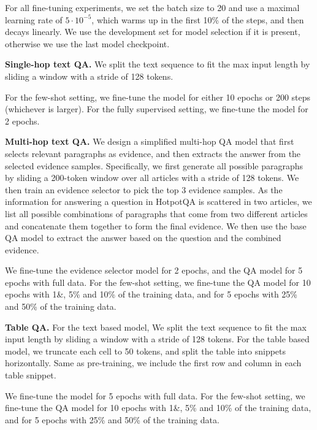\documentclass[11pt]{article}
\begin{document}
For all fine-tuning experiments, we set the batch size to 20 and use a maximal learning rate of $5 \cdot 10^{-5}$, which warms up in the first 10\% of the steps, and then decays linearly. We use the development set for model selection if it is present, otherwise we use the last model checkpoint. 

\noindent\textbf{Single-hop text QA.}
We split the text sequence to fit the max input length by sliding a window with a stride of 128 tokens.

For the few-shot setting, we fine-tune the model for either 10 epochs or 200 steps (whichever is larger). For the fully supervised setting, we fine-tune the model for 2 epochs.

\noindent\textbf{Multi-hop text QA.}
We design a simplified multi-hop QA model that first selects relevant paragraphs as evidence, and then extracts the answer from the selected evidence samples. Specifically, we first generate all possible paragraphs by sliding a 200-token window over all articles with a stride of 128 tokens. We then train an evidence selector to pick the top 3 evidence samples. As the information for answering a question in HotpotQA is scattered in two articles, we list all possible combinations of paragraphs that come from two different articles and concatenate them together to form the final evidence. We then use the base QA model to extract the answer based on the question and the combined evidence.

We fine-tune the evidence selector model for 2 epochs, and the QA model for 5 epochs with full data. For the few-shot setting, we fine-tune the QA model for 10 epochs with 1\&, 5\% and 10\% of the training data, and for 5 epochs with 25\% and 50\% of the training data.

\noindent\textbf{Table QA.}
For the text based model, We split the text sequence to fit the max input length by sliding a window with a stride of 128 tokens. For the table based model, we truncate each cell to 50 tokens, and split the table into snippets horizontally. Same as pre-training, we include the first row and column in each table snippet.

We fine-tune the model for 5 epochs with full data. For the few-shot setting, we fine-tune the QA model for 10 epochs with 1\&, 5\% and 10\% of the training data, and for 5 epochs with 25\% and 50\% of the training data.
\end{document}
